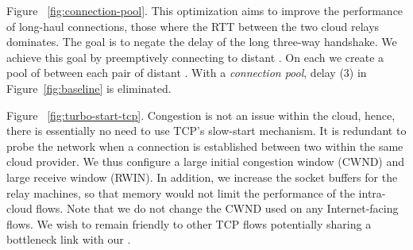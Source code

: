  \xspace Figure ~\ref{fig:connection-pool}. This optimization aims to improve the performance of long-haul connections, \ie those where the RTT between the two cloud relays dominates. The goal is to negate the delay of the long three-way handshake. We achieve this goal by preemptively connecting to distant \relays. On each \relay we create a pool of \reconn between each pair of distant \relays.
With a \textit{connection pool}, delay (3) in Figure~\ref{fig:baseline} is eliminated.

 \xspace Figure ~\ref{fig:turbo-start-tcp}.
Congestion is not an issue within the cloud, hence, there is essentially no need to use TCP's slow-start mechanism. It is redundant to probe the network when a connection is established between two \relays within the same cloud provider. We thus configure a large initial congestion window (CWND) and large receive window (RWIN). In addition, we increase the socket buffers for the relay machines, so that memory would not limit the performance of the intra-cloud flows.
Note that we do not change the CWND used on any Internet-facing flows. We wish to remain friendly to other TCP flows potentially sharing a bottleneck link with our \relays.





